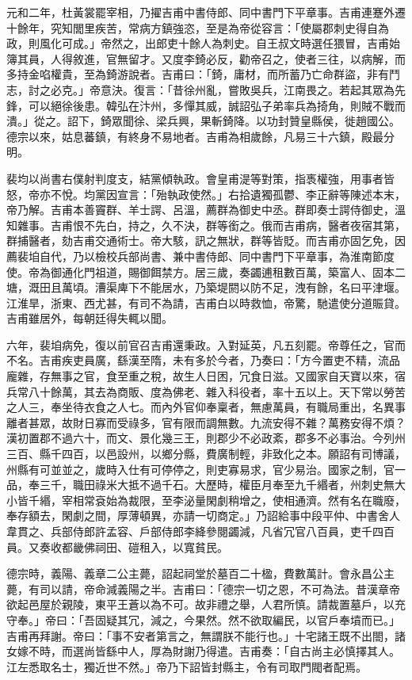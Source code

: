 \begin{pinyinscope}
 元和二年，杜黃裳罷宰相，乃擢吉甫中書侍郎、同中書門下平章事。吉甫連蹇外遷十餘年，究知閭里疾苦，常病方鎮強恣，至是為帝從容言：「使屬郡刺史得自為政，則風化可成。」帝然之，出郎吏十餘人為刺史。自王叔文時選任猥冒，吉甫始簿其員，人得敘進，官無留才。又度李錡必反，勸帝召之，使者三往，以病解，而多持金啗權貴，至為錡游說者。吉甫曰：「錡，庸材，而所蓄乃亡命群盜，非有鬥志，討之必克。」帝意決。復言：「昔徐州亂，嘗敗吳兵，江南畏之。若起其眾為先鋒，可以絕徐後患。韓弘在汴州，多憚其威，誠詔弘子弟率兵為掎角，則賊不戰而潰。」從之。詔下，錡眾聞徐、梁兵興，果斬錡降。以功封贊皇縣侯，徙趙國公。德宗以來，姑息蕃鎮，有終身不易地者。吉甫為相歲餘，凡易三十六鎮，殿最分明。



 裴均以尚書右僕射判度支，結黨傾執政。會皇甫湜等對策，指褭權強，用事者皆怒，帝亦不悅。均黨因宣言：「殆執政使然。」右拾遺獨孤鬱、李正辭等陳述本末，帝乃解。吉甫本善竇群、羊士諤、呂溫，薦群為御史中丞。群即奏士諤侍御史，溫知雜事。吉甫恨不先白，持之，久不決，群等銜之。俄而吉甫病，醫者夜宿其第，群捕醫者，劾吉甫交通術士。帝大駭，訊之無狀，群等皆貶。而吉甫亦固乞免，因薦裴垍自代，乃以檢校兵部尚書、兼中書侍郎、同中書門下平章事，為淮南節度使。帝為御通化門祖道，賜御餌禁方。居三歲，奏蠲逋租數百萬，築富人、固本二塘，溉田且萬頃。漕渠庳下不能居水，乃築堤閼以防不足，洩有餘，名曰平津堰。江淮旱，浙東、西尤甚，有司不為請，吉甫白以時救恤，帝驚，馳遣使分道賑貸。吉甫雖居外，每朝廷得失輒以聞。



 六年，裴垍病免，復以前官召吉甫還秉政。入對延英，凡五刻罷。帝尊任之，官而不名。吉甫疾吏員廣，繇漢至隋，未有多於今者，乃奏曰：「方今置吏不精，流品龐雜，存無事之官，食至重之稅，故生人日困，冗食日滋。又國家自天寶以來，宿兵常八十餘萬，其去為商販、度為佛老、雜入科役者，率十五以上。天下常以勞苦之人三，奉坐待衣食之人七。而內外官仰奉稟者，無慮萬員，有職局重出，名異事離者甚眾，故財日寡而受祿多，官有限而調無數。九流安得不雜？萬務安得不煩？漢初置郡不過六十，而文、景化幾三王，則郡少不必政紊，郡多不必事治。今列州三百、縣千四百，以邑設州，以鄉分縣，費廣制輕，非致化之本。願詔有司博議，州縣有可並並之，歲時入仕有可停停之，則吏寡易求，官少易治。國家之制，官一品，奉三千，職田祿米大抵不過千石。大歷時，權臣月奉至九千緡者，州刺史無大小皆千緡，宰相常袞始為裁限，至李泌量閑劇稍增之，使相通濟。然有名在職廢，奉存額去，閑劇之間，厚薄頓異，亦請一切商定。」乃詔給事中段平仲、中書舍人韋貫之、兵部侍郎許孟容、戶部侍郎李絳參閱蠲減，凡省冗官八百員，吏千四百員。又奏收都畿佛祠田、磑租入，以寬貧民。



 德宗時，義陽、義章二公主薨，詔起祠堂於墓百二十楹，費數萬計。會永昌公主薨，有司以請，帝命減義陽之半。吉甫曰：「德宗一切之恩，不可為法。昔漢章帝欲起邑屋於親陵，東平王蒼以為不可。故非禮之舉，人君所慎。請裁置墓戶，以充守奉。」帝曰：「吾固疑其冗，減之，今果然。然不欲取編民，以官戶奉墳而已。」吉甫再拜謝。帝曰：「事不安者第言之，無謂朕不能行也。」十宅諸王既不出閤，諸女嫁不時，而選尚皆繇中人，厚為財謝乃得遣。吉甫奏：「自古尚主必慎擇其人。江左悉取名士，獨近世不然。」帝乃下詔皆封縣主，令有司取門閥者配焉。




\end{pinyinscope}
